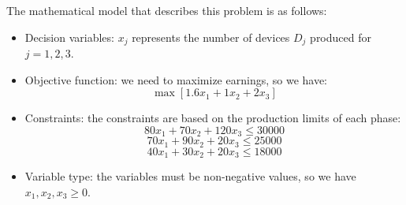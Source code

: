 \documentclass[12pt, a4paper]{report}
\begin{document}
\begin{example}
        The mathematical model that describes this problem is as follows:
        \begin{itemize}
            \item Decision variables: $x_j$ represents the number of devices $D_j$ produced for $j=1,2,3$.
            \item Objective function: we need to maximize earnings, so we have: 
                \[\max{\left[1.6x_1+1x_2+2x_3\right]}\]
            \item Constraints: the constraints are based on the production limits of each phase:
                \[80x_1+70x_2+120x_3 \leq 30000\]
                \[70x_1+90x_2+20x_3 \leq 25000\]
                \[40x_1+30x_2+20x_3 \leq 18000\]
            \item Variable type: the variables must be non-negative values, so we have $x_1,x_2,x_3 \geq 0$.
        \end{itemize}
    \end{example}
\end{document}
